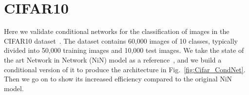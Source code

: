 \documentclass[thesis]{subfiles}
\begin{document}





\section{CIFAR10}
Here we validate conditional networks for the classification of images in the CIFAR10 dataset~\cite{CIFAR10}. 
The dataset contains 60,000 images of 10 classes, typically divided into 50,000 training images and 10,000 test images. 
We take the state of the art Network in Network (NiN) model 
as a reference~\cite{Lin2013NiN}, and we build a conditional version of it to produce the architecture in Fig.~\ref{fig:Cifar_CondNet}. 
Then we go on to show its increased efficiency compared to the original NiN model.
\end{document}
